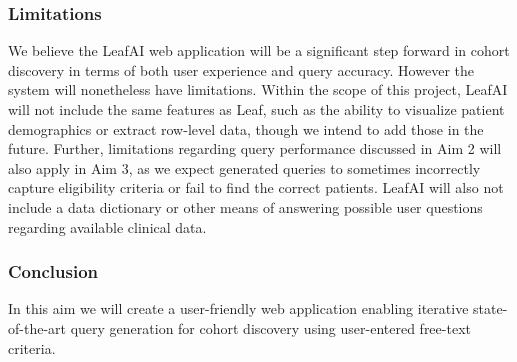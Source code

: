 \documentclass[../main.tex]{subfiles}
\begin{document}
\subsubsection{Limitations}

We believe the LeafAI web application will be a significant step forward in cohort discovery in terms of both user experience and query accuracy. However the system will nonetheless have limitations. Within the scope of this project, LeafAI will not include the same features as Leaf, such as the ability to visualize patient demographics or extract row-level data, though we intend to add those in the future. Further, limitations regarding query performance discussed in Aim 2 will also apply in Aim 3, as we expect generated queries to sometimes incorrectly capture eligibility criteria or fail to find the correct patients. LeafAI will also not include a data dictionary or other means of answering possible user questions regarding available clinical data.

\subsubsection{Conclusion}

In this aim we will create a user-friendly web application enabling iterative state-of-the-art query generation for cohort discovery using user-entered free-text criteria.
\end{document}
